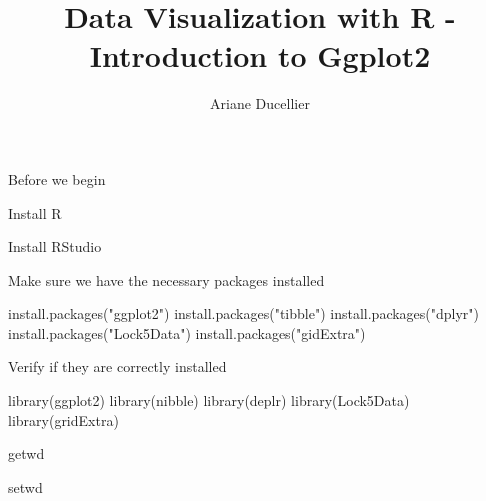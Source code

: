 \documentclass{beamer}
\title[Introduction to Ggplot2]{Data Visualization with R - Introduction to Ggplot2}
\author{Ariane Ducellier}
\begin{document}
	\begin{frame}
		\titlepage
	\end{frame}

	\begin{frame}


Before we begin

Install R

Install RStudio

Make sure we have the necessary packages installed

install.packages("ggplot2")
install.packages("tibble")
install.packages("dplyr")
install.packages("Lock5Data")
install.packages("gidExtra")

Verify if they are correctly installed

library(ggplot2)
library(nibble)
library(deplr)
library(Lock5Data)
library(gridExtra)

getwd

setwd

	\end{frame}
\end{document}
